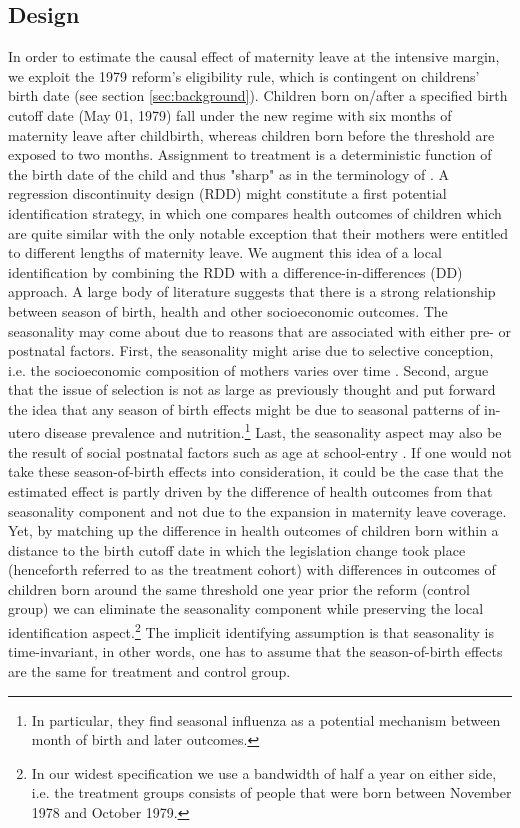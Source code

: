 \documentclass[11pt, a4paper,draft]{article} %
\begin{document}
\subsection{Design}\label{sec:empirical_strategy_1design}
In order to estimate the causal effect of maternity leave at the intensive margin, we exploit the 1979 reform's eligibility rule, which is contingent on childrens' birth date (see section \ref{sec:background}). Children born on/after a specified birth cutoff date (May 01, 1979) fall under the new regime with six months of maternity leave after childbirth, whereas children born before the threshold are exposed to two months. Assignment to treatment is a deterministic function of the birth date of the child and thus "sharp" as in the terminology of \cite{hahn2001identification}. A regression discontinuity design (RDD) might constitute a first potential identification strategy, in which one compares health outcomes of children which are quite similar with the only notable exception that their mothers were entitled to different lengths of maternity leave.\newline 
We augment this idea of a local identification by combining the RDD with a difference-in-differences (DD) approach. A large body of literature suggests that there is a strong relationship between season of birth, health and other socioeconomic outcomes. The seasonality may come about due to reasons that are associated with either pre- or postnatal factors. First, the seasonality might arise due to selective conception, i.e. the socioeconomic composition of mothers varies over time \citep{buckles2013season}. Second, \cite{currie2013within} argue that the issue of selection is not as large as previously thought and put forward the idea that any season of birth effects might be due to seasonal patterns of in-utero disease prevalence and nutrition.\footnote{In particular, they find seasonal influenza as a potential mechanism between month of birth and later outcomes.} Last, the seasonality aspect may also be the result of social postnatal factors such as age at school-entry \citep{black2011too}. \newline If one would not take these season-of-birth effects into consideration, it could be the case that the estimated effect is partly driven by the difference of health outcomes from that seasonality component and not due to the expansion in maternity leave coverage. Yet, by matching up the difference in health outcomes of children born within a distance to the birth cutoff date in which the legislation change took place (henceforth referred to as the treatment cohort) with differences in outcomes of children born around the same threshold one year prior the reform (control group) we can eliminate the seasonality component while preserving the local identification aspect.\footnote{In our widest specification we use a bandwidth of half a year on either side, i.e. the treatment groups consists of people that were born between November 1978 and October 1979.}
The implicit identifying assumption is that seasonality is time-invariant, in other words, one has to assume that the season-of-birth effects are the same for treatment and control group.\newline
\end{document}
